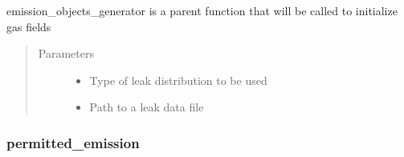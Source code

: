 \documentclass[letterpaper,10pt,english]{sphinxmanual}
\begin{document}
\begin{fulllineitems}
\label{\detokenize{index:feast.EmissionSimModules.emission_class_functions.emission_objects_generator}}
emission\_objects\_generator is a parent function that will be called to initialize gas fields
\begin{quote}\begin{description}
\item[{Parameters}] \leavevmode\begin{itemize}
\item {} 
 \textendash{} Type of leak distribution to be used

\item {} 
 \textendash{} Path to a leak data file

\end{itemize}

\end{description}\end{quote}

\end{fulllineitems}



\subsubsection{permitted\_emission}
\label{\detokenize{index:permitted-emission}}
\end{document}
